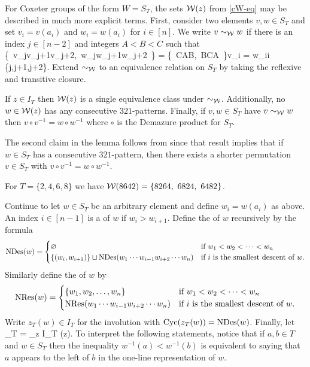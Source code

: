 \documentclass[10pt]{article}
\begin{document}
For Coxeter groups of the form $W=S_T$, the sets $\mathcal{W}(z)$ 
from \eqref{cW-eq} may be described in much more explicit terms. 
First, consider two elements $v,w \in S_T$ and set $v_i = v(a_i)$ and $w_i = w(a_i)$ for $ i \in [n]$.
We write $v\sim_{\mathcal{W}} w$ if there is an index $ j \in [n-2]$ and integers $A<B<C$ such that 
\be
\{\ v_jv_{j+1}v_{j+2},\ w_jw_{j+1}w_{j+2}\ \} = \{\ CAB,\ BCA\ \}\quand v_i = w_ii \notin \{j,j+1,j+2\}.
\ee
Extend $\sim_{\mathcal{W}}$ to an equivalence relation on $S_T$ by taking the reflexive and transitive closure.

\begin{lemma}
\label{CAB-lem}
If $z \in I_T$ then $\mathcal{W}(z)$ is a single equivalence class under $\sim_{\mathcal{W}}$. Additionally, no $w \in \mathcal{W}(z)$ has any consecutive $321$-patterns.
Finally, if $v,w \in S_T$ have $v\sim_{\mathcal{W}} w$ then $v\circ v^{-1} = w\circ w^{-1}$
where $\circ $ is the Demazure product for $S_T$.

\end{lemma}

The second claim in the lemma follows from \cite[Thm.~6.4]{HMP2}
since that result implies that if $w\in S_T$ has a consecutive $321$-pattern,
then there exists a shorter permutation $v\in S_T$ with $v\circ v^{-1} = w\circ w^{-1}$.

\begin{example}
For $T=\{2,4,6,8\}$ we have $\cW(8642) = \{8264,\ 6824,\ 6482\}$.
\end{example}

Continue to let $w \in S_T$ be an arbitrary element and define $w_i = w(a_i)$ as above.
An index $ i \in [n-1]$ is a  of $w$ if $w_i > w_{i+1}$. Define the  of $w$ recursively by the formula
\[
\mathrm{NDes}(w) = \begin{cases} 
\varnothing &\text{if $w_1<w_2<\dots<w_n$} \\ 
\{ (w_i,w_{i+1})\} \sqcup \mathrm{NDes}(w_1\cdots w_{i-1}w_{i+2}\cdots w_n) &\text{if $i$ is the smallest descent of $w$.}
\end{cases}
\]
Similarly define the  of $w$ by 
\[
\mathrm{NRes}(w) = \begin{cases} 
\{w_1,w_2,\dots,w_n\} &\text{if $w_1<w_2<\dots<w_n$} \\ 
 \mathrm{NRes}(w_1\cdots w_{i-1}w_{i+2}\cdots w_n) &\text{if $i$ is the smallest descent of $w$.}
\end{cases}
\]
Write $z_T(w) \in I_T$ for the involution with  $\mathrm{Cyc}(z_T(w))=\mathrm{NDes}(w)$. Finally, let 
\be
\textstyle \cW_T = \bigsqcup_{z \in I_T} \cW(z).
\ee
To interpret the following statements,
notice that if $a,b \in T$ and $w\in S_T$ then the inequality $w^{-1}(a) < w^{-1}(b)$
is equivalent to saying that $a$ appears to the left of $b$ in the one-line representation of $w$.
\end{document}

